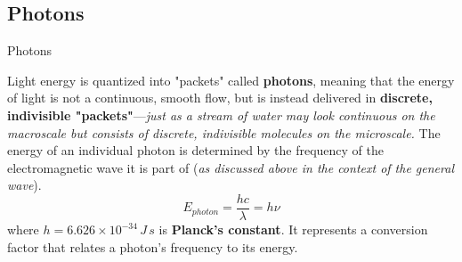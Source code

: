 \documentclass[10pt]{article}
\begin{document}
  \subsection{Photons}

    \begin{core}{Photons}

      Light energy is quantized into "packets" called \textbf{photons}, meaning that the energy of light is not a continuous, smooth flow, but is instead delivered in \textbf{discrete, indivisible "packets"}---\textit{just as a stream of water may look continuous on the macroscale but consists of discrete, indivisible  molecules on the microscale.} The energy of an individual photon is determined by the frequency of the electromagnetic wave it is part of (\textit{as discussed above in the context of the general wave}). 
      \[
        E_{photon} = \frac{hc}{λ} = hν
      \]
      where $h = 6.626 \times 10^{-34}\,J\,s$ is \textbf{Planck's constant}. It represents a conversion factor that relates a photon's frequency to its energy.

    \end{core}
\end{document}
